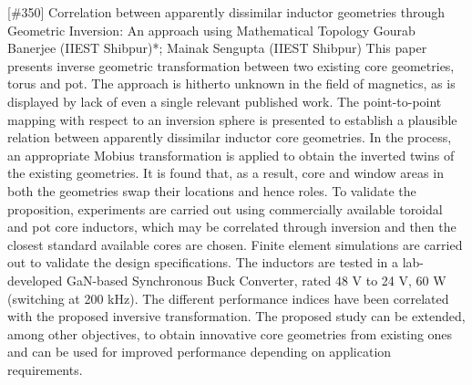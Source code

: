{} \begin{abstract_online} {[\#350] Correlation between apparently dissimilar inductor geometries through Geometric Inversion: An approach using Mathematical Topology} {} {Gourab Banerjee (IIEST Shibpur)*; Mainak Sengupta (IIEST Shibpur)} {} This paper presents inverse geometric transformation between two existing core geometries, torus and pot. The approach is hitherto unknown in the field of magnetics, as is displayed by lack of even a single relevant published work. The point-to-point mapping with respect to an inversion sphere is presented to establish a plausible relation between apparently dissimilar inductor core geometries. In the process, an appropriate Mobius transformation is applied to obtain the inverted twins of the existing geometries. It is found that, as a result, core and window areas in both the geometries swap their locations and hence roles. To validate the proposition, experiments are carried out using commercially available toroidal and pot core inductors, which may be correlated through inversion and then the closest standard available cores are chosen. Finite element simulations are carried out to validate the design specifications. The inductors are tested in a lab-developed GaN-based Synchronous Buck Converter, rated 48 V to 24 V, 60 W (switching at 200 kHz). The different performance indices have been correlated with the proposed inversive transformation. The proposed study can be extended, among other objectives, to obtain innovative core geometries from existing ones and can be used for improved performance depending on application requirements.  \end{abstract_online} 
